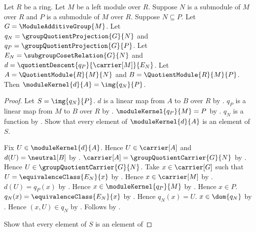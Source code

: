 \begin{theorem}\label{module_quotient_comparison_kernel}
    Let $R$ be a ring.
    Let $M$ be a left module over $R$.
    Suppose $N$ is a submodule of $M$ over $R$ and
        $P$ is a submodule of $M$ over $R$.
    Suppose $N\subseteq P$.
    Let $G=\ModuleAdditiveGroup{M}$.
    Let $q_N=\groupQuotientProjection{G}{N}$ and
        $q_P=\groupQuotientProjection{G}{P}$.
    Let $E_N=\subgroupCosetRelation{G}{N}$ and
        $d=\quotientDescent{q_P}{\carrier[M]}{E_N}$.
    Let $A=\QuotientModule{R}{M}{N}$ and
        $B=\QuotientModule{R}{M}{P}$.
    Then $\moduleKernel{d}{A}=\img{q_N}{P}$.
\end{theorem}
\begin{proof}
    Let $S=\img{q_N}{P}$.
    $d$ is a linear map from $A$ to $B$ over $R$ by
        .
    $q_P$ is a linear map from $M$ to $B$ over $R$ by
        .
    $\moduleKernel{q_P}{M}=P$ by
        .
    $q_N$ is a function by
        .
    Show that every element of $\moduleKernel{d}{A}$
        is an element of $S$.
    \begin{subproof}
        Fix $U\in\moduleKernel{d}{A}$.
        Hence $U\in\carrier[A]$ and $d(U)=\neutral[B]$ by
            .
        $\carrier[A]=\groupQuotientCarrier{G}{N}$ by
            .
        Hence $U\in\groupQuotientCarrier{G}{N}$.
        Take $x\in\carrier[G]$ such that
            $U=\equivalenceClass{E_N}{x}$ by
            .
        Hence $x\in\carrier[M]$ by
            .
        $d(U)=q_P(x)$ by
            .
        Hence $x\in\moduleKernel{q_P}{M}$ by
            .
        Hence $x\in P$.
        $q_N(x)=\equivalenceClass{E_N}{x}$ by
            .
        Hence $q_N(x)=U$.
        $x\in\dom{q_N}$ by
            .
        Hence $(x,U)\in q_N$ by .
        Follows by .
    \end{subproof}
    Show that every element of $S$ is an element of

\end{proof}
